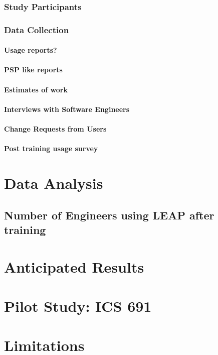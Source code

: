\subsubsection{Study Participants}
\subsubsection{Data Collection}
\paragraph{Usage reports?}
\paragraph{PSP like reports}
\paragraph{Estimates of work}
\paragraph{Interviews with Software Engineers}
\paragraph{Change Requests from Users}
\paragraph{Post training usage survey}

\section{Data Analysis}
\subsection{}
\subsection{}
\subsection{Number of Engineers using LEAP after training}

\section{Anticipated Results}

\section{Pilot Study: ICS 691}


\section{Limitations}
